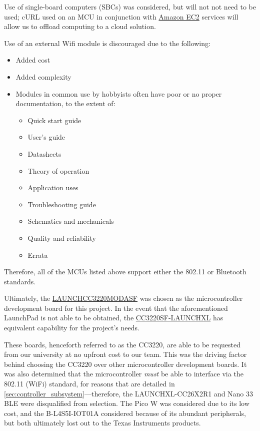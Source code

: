 Use of single-board computers (SBCs) was considered, but will not not need to be used; cURL 
used on an MCU in conjunction with \href{https://aws.amazon.com/ec2/}{Amazon EC2} services will
allow us to offload computing to a cloud solution.

Use of an external Wifi module is discouraged due to the following:
\begin{itemize}
	\item Added cost
	\item Added complexity
	\item Modules in common use by hobbyists often have poor or no proper documentation, to the
	extent of:
	\begin{itemize}
		\item Quick start guide
		\item User's guide
		\item Datasheets
		\item Theory of operation
		\item Application uses
		\item Troubleshooting guide
		\item Schematics and mechanicals
		\item Quality and reliability
		\item Errata
	\end{itemize}
\end{itemize}

Therefore, all of the MCUs listed above support either the 802.11 or Bluetooth standards.

Ultimately, the \href{https://www.ti.com/tool/LAUNCHCC3220MODASF}{LAUNCHCC3220MODASF}
was chosen as the microcontroller development board for this project. In the event that the
aforementioned LaunchPad is not able to be obtained, the
\href{https://www.ti.com/tool/CC3220SF-LAUNCHXL}{CC3220SF-LAUNCHXL} has equivalent capability
for the project's needs.

These boards, henceforth referred to as the CC3220, are able to be requested from our
university at no upfront cost to our team. This was the driving factor behind choosing 
the CC3220 over other microcontroller development boards. It was also determined that
the microcontroller \emph{must} be able to interface via the 802.11 (WiFi) standard, for reasons
that are detailed in \autoref{sec:controller_subsystem}---therefore, the LAUNCHXL-CC26X2R1
and Nano 33 BLE were disqualified from selection. The Pico W was considered due to its low cost,
and the B-L4S5I-IOT01A considered because of its abundant peripherals, but both ultimately lost
out to the Texas Instruments products.

